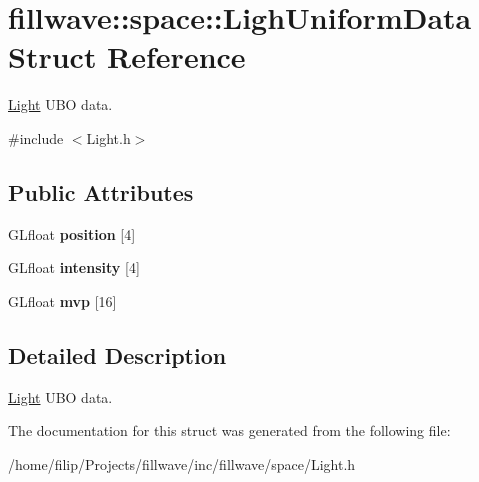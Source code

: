 \hypertarget{structfillwave_1_1space_1_1LighUniformData}{}\section{fillwave\+:\+:space\+:\+:Ligh\+Uniform\+Data Struct Reference}
\label{structfillwave_1_1space_1_1LighUniformData}


\hyperlink{classfillwave_1_1space_1_1Light}{Light} U\+B\+O data.  




{\ttfamily \#include $<$Light.\+h$>$}

\subsection*{Public Attributes}
\begin{DoxyCompactItemize}
\item 
\hypertarget{structfillwave_1_1space_1_1LighUniformData_a9bb27c99f96c56eae7c1125162b6b309}{}G\+Lfloat {\bfseries position} \mbox{[}4\mbox{]}\label{structfillwave_1_1space_1_1LighUniformData_a9bb27c99f96c56eae7c1125162b6b309}

\item 
\hypertarget{structfillwave_1_1space_1_1LighUniformData_a9e2ff9c77fcbd7a8a18e21a0cff8a932}{}G\+Lfloat {\bfseries intensity} \mbox{[}4\mbox{]}\label{structfillwave_1_1space_1_1LighUniformData_a9e2ff9c77fcbd7a8a18e21a0cff8a932}

\item 
\hypertarget{structfillwave_1_1space_1_1LighUniformData_aa7ebb496349fe71f7a9c25647bf915ab}{}G\+Lfloat {\bfseries mvp} \mbox{[}16\mbox{]}\label{structfillwave_1_1space_1_1LighUniformData_aa7ebb496349fe71f7a9c25647bf915ab}

\end{DoxyCompactItemize}


\subsection{Detailed Description}
\hyperlink{classfillwave_1_1space_1_1Light}{Light} U\+B\+O data. 

The documentation for this struct was generated from the following file\+:\begin{DoxyCompactItemize}
\item 
/home/filip/\+Projects/fillwave/inc/fillwave/space/Light.\+h\end{DoxyCompactItemize}
